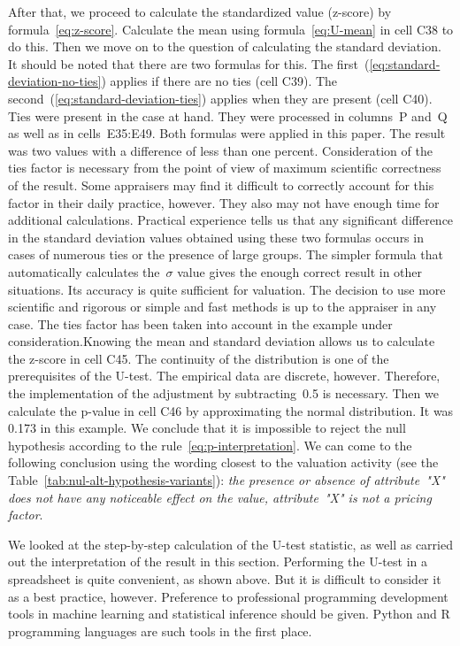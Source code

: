 \documentclass[]{scrreprt}
\begin{document}
After that, we proceed to calculate the standardized value (z-score) by formula~\ref{eq:z-score}. Calculate the mean using formula~\ref{eq:U-mean} in cell C38 to do this. Then we move on to the question of calculating the standard deviation. It should be noted that there are two formulas for this. The first~(\ref{eq:standard-deviation-no-ties}) applies if there are no ties (cell C39). The second~(\ref{eq:standard-deviation-ties}) applies when they are present (cell C40). Ties were present in the case at hand. They were processed in columns~P and~Q as well as in cells~E35:E49. Both formulas were applied in this paper. The result was two values with a difference of less than one percent. Consideration of the ties factor is necessary from the point of view of maximum scientific correctness of the result. Some appraisers may find it difficult to correctly account for this factor in their daily practice, however. They also may not have enough time for additional calculations. Practical experience tells us that any significant difference in the standard deviation values obtained using these two formulas occurs in cases of numerous ties or the presence of large groups. The simpler formula that automatically calculates the~${\sigma}$ value gives the enough correct result in other situations. Its accuracy is quite sufficient for valuation. The decision to use more scientific and rigorous or simple and fast methods is up to the appraiser in any case. The ties factor has been taken into account in the example under consideration.Knowing the mean and standard deviation allows us to calculate the z-score in cell C45. The continuity of the distribution is one of the prerequisites of the U-test. The empirical data are discrete, however. Therefore, the implementation of the adjustment by subtracting~0.5 is necessary. Then we calculate the p-value in cell C46 by approximating the normal distribution. It was 0.173 in this example. We conclude that it is impossible to reject the null hypothesis according to the rule~\ref{eq:p-interpretation}. We can come to the following conclusion using the wording closest to the valuation activity (see the Table~\ref{tab:nul-alt-hypothesis-variants}): \emph{the presence or absence of attribute~"X" does not have any noticeable effect on the value, attribute~"X" is not a pricing factor}.

We looked at the step-by-step calculation of the U-test statistic, as well as carried out the interpretation of the result in this section. Performing the U-test in a spreadsheet is quite convenient, as shown above. But it is difficult to consider it as a best practice, however. Preference to professional programming development tools in machine learning and statistical inference should be given. Python and R programming languages are such tools in the first place.
%
\clearpage
%
\end{document}
